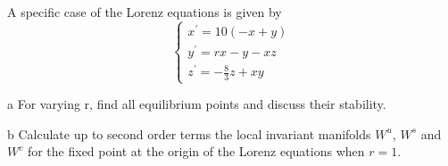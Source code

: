 \documentclass{article}
\begin{document}
\begin{list}
\item A specific case of the Lorenz equations is given by
\begin{equation}
\left\{\begin{array}{l}
x^{\prime}=10(-x+y) \\
y^{\prime}=r x-y-x z \\
z^{\prime}=-\frac{8}{3} z+x y
\end{array}\right.
\end{equation}
\item [a] For varying r, find all equilibrium points and discuss
their stability.
\item [b] Calculate up to second order terms the local invariant manifolds $W^u$, $W^s$ and $W^c$
for the fixed point at the origin of the Lorenz equations when $r=1$.



\end{list}
\end{document}
